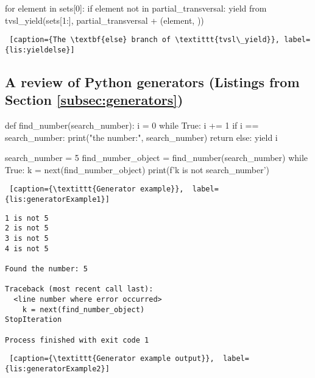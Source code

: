 \noindent
\begin{minipage}{\linewidth} \largev  
\begin{python}[numbers=left]
    for element in sets[0]:
      if element not in partial_transversal:
        yield from tvsl_yield(sets[1:], partial_transversal + (element, ))
\end{python}
\begin{lstlisting} [caption={The \textbf{else} branch of \textittt{tvsl\_yield}}, label={lis:yieldelse}]
\end{lstlisting}
\end{minipage}

\subsection{A review of Python generators (Listings from Section \ref{subsec:generators})} \label{appsubsec:generators}


\begin{minipage}{\linewidth}  \hrulefill  
\begin{python}[numbers=left]
def find_number(search_number):
    i = 0
    while True:
        i += 1
        if i == search_number:
            print("\nFound the number:", search_number)
            return
        else:
            yield i

search_number = 5
find_number_object = find_number(search_number)
while True:
    k = next(find_number_object)
    print(f'{k} is not {search_number}')
\end{python}
\begin{lstlisting} [caption={\textittt{Generator example}},  label={lis:generatorExample1}]
\end{lstlisting}
\end{minipage}


\noindent
\begin{minipage}{\linewidth}  \largev   
\begin{verbatim}
1 is not 5
2 is not 5
3 is not 5
4 is not 5

Found the number: 5

Traceback (most recent call last):
  <line number where error occurred> 
    k = next(find_number_object)
StopIteration

Process finished with exit code 1
\end{verbatim}
\begin{lstlisting} [caption={\textittt{Generator example output}},  label={lis:generatorExample2}]
\end{lstlisting}
\end{minipage}

